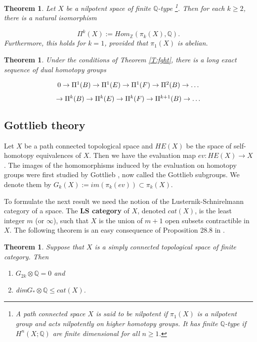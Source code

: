 \documentclass[a4paper,14pt]{article}
\newcommand{\B}[1]{\mathbb #1}
\newcommand{\qed}{\rightline {$\Box $}}
\newtheorem{thm}[theorem]{Theorem}
\numberwithin{equation}{section}
\numberwithin{figure}{section}
\begin{document}
\begin{thm}\label{T:pi}
Let $X$ be a nilpotent space of finite $\B Q$-type 
\footnote{
A path connected space $X$ is said to be nilpotent if $\pi _1(X)$
is a nilpotent group and acts nilpotently on higher homotopy
groups. It has finite $\B Q$-type if $H^n(X;\B Q)$ are finite
dimensional for all $n\geq 1$.}.
Then for each $k\geq 2$, there is a natural isomorphism 


$$\Pi^k(X):=Hom_{\B Z}(\pi _k(X),\B Q).$$
Furthermore, this holds for $k=1$, provided that $\pi _1(X)$ is
abelian.\qed
\end{thm}




\begin{thm}\label{T:les}
Under the conditions of Theorem \ref{T:fght}, there is a long exact sequence
of dual homotopy groups

$$
\CD
0\to \Pi^1(B) \to \Pi^1(E) \to \Pi^1(F) \to \Pi^2(B)\to \dots \\
\to \Pi^k(B) \to \Pi^k(E) \to \Pi^k(F) \to \Pi^{k+1}(B)\to \dots 
\endCD
$$
\qed
\end{thm}



\noindent
\subsection{Gottlieb theory}\label{SS:gt}

Let $X$ be a path connected topological space and $HE(X)$
be the space of self-homotopy equivalences of $X$.
Then we have  the evaluation
map $ev:HE(X)\to X$. The images of the homomorphisms
induced by the evaluation on homotopy groups were first
studied by Gottlieb \cite{got1,got2}, now
called the Gottlieb subgroups. We denote them
by $G_k(X) := im(\pi _k(ev))\subset \pi_k(X)$.

To formulate the next result we need the notion of
the Lusternik-Schnirelmann category of a space.
The {\bf LS category} of $X$, denoted $cat(X)$, is the
least integer $m$ (or $\infty $), such that $X$
is the union of $m+1$ open subsets contractible in $X$.
The following theorem is an easy consequence of 
Proposition 28.8 in \cite{fht}.

\begin{thm}\label{T:got}
Suppose that $X$ is a simply connected topological space
of finite category. Then 
\begin{enumerate}
\item $G_{2k} \otimes \B Q = 0$ and
\item dim$G_* \otimes \B Q \leq cat(X)$.
\end{enumerate}\qed
\end{thm}
\end{document}
